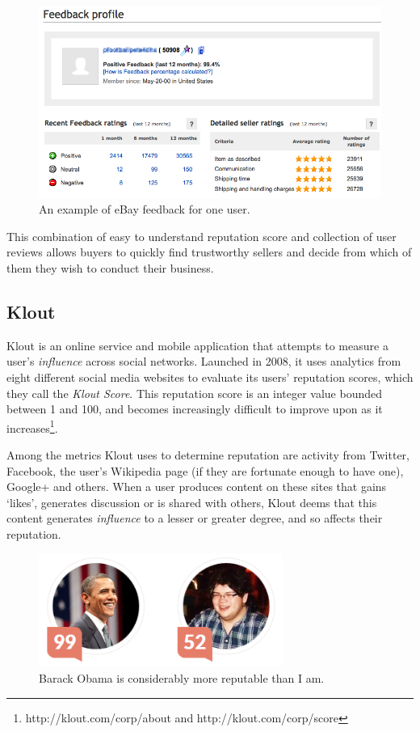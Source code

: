 \documentclass[]{final_report}
\begin{document}
\begin{figure}[ht!]
\centering
\includegraphics[width=140mm]{ebayfeedback.PNG}
\caption{An example of eBay feedback for one user.}
\end{figure}

This combination of easy to understand reputation score and collection of user reviews allows buyers to quickly find trustworthy sellers and decide from which of them they wish to conduct their business.

\subsection{Klout}

Klout is an online service and mobile application that attempts to measure a user's \textsl{influence} across social networks. Launched in 2008, it uses analytics from eight different social media websites to evaluate its users' reputation scores, which they call the \textsl{Klout Score}. This reputation score is an integer value bounded between 1 and 100, and becomes increasingly difficult to improve upon as it increases\footnote{http://klout.com/corp/about and http://klout.com/corp/score}.

Among the metrics Klout uses to determine reputation are activity from Twitter, Facebook, the user's Wikipedia page (if they are fortunate enough to have one), Google+ and others. When a user produces content on these sites that gains `likes', generates discussion or is shared with others, Klout deems that this content generates \textsl{influence} to a lesser or greater degree, and so affects their reputation.

\begin{figure}[ht!]
\centering
\includegraphics[width=80mm]{klout.png}
\caption{Barack Obama is considerably more reputable than I am.}
\end{figure}
\end{document}
